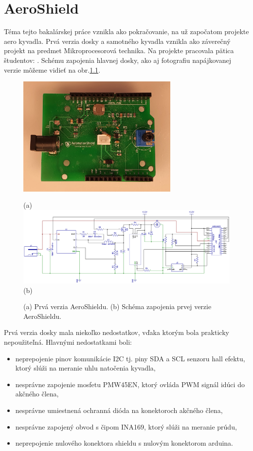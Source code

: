 \chapter{AeroShield}

Téma tejto bakalárskej práce vznikla ako pokračovanie, na už započatom projekte aero kyvadla. Prvá verzia dosky a samotného kyvadla vznikla ako záverečný projekt na predmet Mikroprocesorová technika. Na projekte pracovala pätica študentov: . Schému zapojenia hlavnej dosky, ako aj fotografiu napájkovanej verzie môžeme vidieť na obr.\ref{OBRAZOK 2.1.1}.


\begin{figure}[!tbh]
\centering
\includegraphics[width=80mm]{obr/oldshield.jpg}

(a)
\includegraphics[width=\linewidth]{obr/oldshieldscheme.png}
(b)
\caption{(a) Prvá verzia AeroShieldu. (b) Schéma zapojenia prvej verzie AeroShieldu.}
\label{OBRAZOK 2.1.1}
\end{figure}

\vspace{3cm}

Prvá verzia dosky mala niekoľko nedostatkov, vďaka ktorým bola prakticky nepoužiteľná. Hlavnými nedostatkami boli:

\begin{itemize}
\item neprepojenie pinov komunikácie I2C tj. piny SDA a SCL senzoru hall efektu, ktorý slúži na meranie uhlu natočenia kyvadla,
\item nesprávne zapojenie mosfetu PMW45EN, ktorý ovláda PWM signál idúci do akčného člena,
\item nesprávne umiestnená ochranná dióda na konektoroch akčného člena,
\item nesprávne zapojený obvod s čipom INA169, ktorý slúži na meranie prúdu,
\item neprepojenie nulového konektora shieldu s nulovým konektorom arduina.
\end{itemize}

